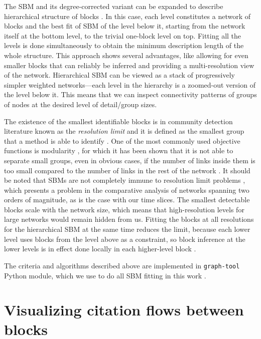 \documentclass[a4paper,12pt]{article}
\begin{document}
The SBM and its degree-corrected variant can be expanded to describe hierarchical structure of 
blocks \citep{Peixoto_hierarchical_2014}. In this case, each level constitutes a network of blocks and the best fit of SBM of the level below it, starting from the network itself at the bottom level, to the 
trivial one-block level on top. Fitting all the levels is done simultaneously to obtain the minimum description length of the whole structure. This approach shows several advantages, like 
allowing for even smaller blocks that can reliably be inferred
and providing a multi-resolution view of the network.
Hierarchical SBM can be viewed as a stack of progressively simpler weighted 
networks---each level in the hierarchy is a zoomed-out version of the level below it.
This means that we can inspect connectivity patterns of groups of nodes at the desired level of detail/group sizes. 

The existence of the smallest identifiable blocks is in community detection literature
known as the \emph{resolution limit} and it is defined as the smallest group that 
a method is able to identify \citep{Fortunato2007}. One of the most commonly used objective functions is 
modularity \citep{Newman2004}, for which it has been shown that it is not 
able to separate small groups, even in obvious cases, if the number of links inside 
them is too small compared to the number of links in the rest of the network \citep{Fortunato2007}.
It should be noted that SBMs are not completely immune to resolution limit problems \citep{Choi2012,Peixoto_parsimonious_2013}, 
which presents a problem in the comparative analysis of networks spanning
two orders of magnitude, as is the case with our time slices. The smallest detectable 
blocks scale with the network size, which means that high-resolution levels for large 
networks would remain hidden from us.
Fitting the blocks at all resolutions for the hierarchical SBM at the same time reduces the limit, because each lower level uses blocks from the level above as a 
constraint, so block inference at the lower levels is in effect done locally in each higher-level block
\citep{Peixoto_hierarchical_2014}.

The criteria and algorithms described above are implemented in \texttt{graph-tool} Python module,
which we use to do all SBM fitting in this work \citep{peixoto_graph-tool_2014}.



\section{Visualizing citation flows between blocks}
\label{sec:vis_cit_flows}
\end{document}
